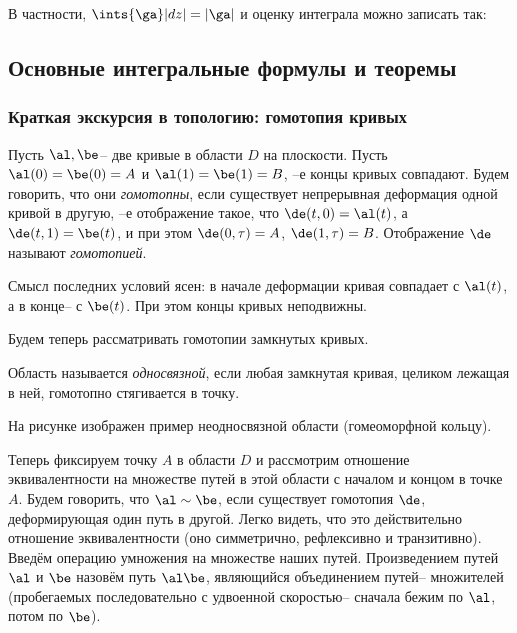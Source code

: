 \documentclass[a4paper]{article}
\begin{document}
В частности, $\ints{\ga}|dz|= |\ga|$ и оценку интеграла можно записать так:


\subsection{Основные интегральные формулы и теоремы}

\subsubsection{Краткая экскурсия в топологию: гомотопия кривых}

\begin{df}
Пусть $\al, \be$-- две кривые в области $D$ на плоскости. Пусть $\al(0)=\be(0)=A$ и
$\al(1)=\be(1)=B$, --е концы кривых совпадают. Будем говорить, что они \emph{гомотопны}, если существует
непрерывная деформация одной кривой в другую, --е отображение  такое, что $\de(t,0)=\al(t)$, а $\de(t,1)=\be(t)$, и при этом $\de(0,\tau)=A$,
$\de(1,\tau)=B$. Отображение $\de$ называют \emph{гомотопией}.
\end{df}

Смысл последних условий ясен: в начале деформации кривая совпадает с $\al(t)$, а в конце--
с $\be(t)$. При этом концы кривых неподвижны.

Будем теперь рассматривать гомотопии замкнутых кривых.

\begin{df}
Область называется \emph{односвязной}, если любая замкнутая кривая, целиком лежащая в ней, гомотопно
стягивается в точку.
\end{df}
На рисунке изображен пример неодносвязной области (гомеоморфной кольцу).

Теперь фиксируем точку $A$ в области $D$ и рассмотрим отношение эквивалентности на
множестве путей в этой области с началом и концом в точке $A$. Будем говорить, что $\al \sim \be$, если
существует гомотопия $\de$, деформирующая один путь в другой. Легко видеть, что это действительно отношение
эквивалентности (оно симметрично, рефлексивно и транзитивно). Введём операцию умножения на множестве наших
путей. Произведением путей $\al$ и $\be$ назовём путь $\al\be$, являющийся объединением путей-- множителей
(пробегаемых последовательно с удвоенной скоростью-- сначала бежим по $\al$, потом по $\be$).
\end{document}
